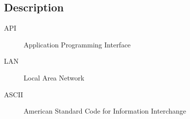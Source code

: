 \subsection{Description}
\begin{description}
    \item[API] Application Programming Interface
    \item[LAN] Local Area Network
    \item[ASCII] American Standard Code for Information Interchange
\end{description}